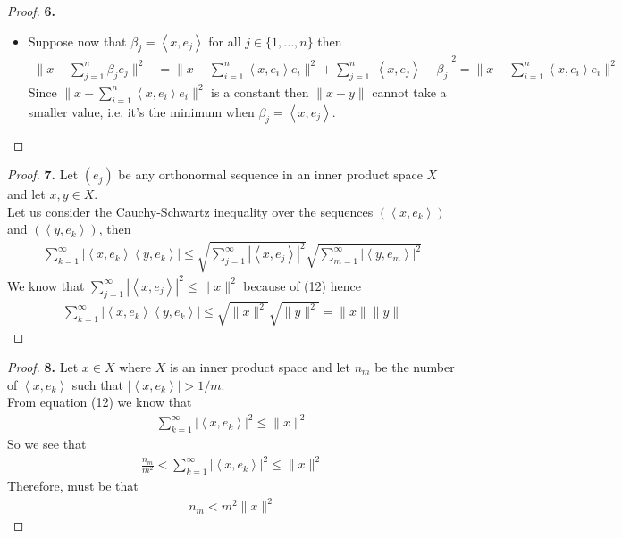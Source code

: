 \documentclass[11pt]{article}
\newcommand{\inprd}[1]{\left\langle{#1}\right\rangle}
\theoremstyle{definition}
\begin{document}
\begin{proof}{\textbf{6.}}
\begin{itemize}
\begin{align*}
    &=\sum_{k=1}^n(\inprd{x, e_k} - \beta_k)
    \sum_{j=1}^n (\inprd{x, e_j} - \beta_j)\inprd{e_k, e_j}\\
    &=\sum_{k=1}^n|\inprd{x, e_k} - \beta_k|^2
\end{align*}
Therefore since the first term, $\|x - \sum_{i=1}^n \inprd{x, e_i} e_i\|^2$,
is constant, and we said that $\|x -y\|^2$ is mininum then must be that
\begin{align*}
    \sum_{k=1}^n|\inprd{x, e_k} - \beta_k|^2 = 0
\end{align*}
And that can only happen if $\beta_k = \inprd{x, e_k}$ for all
$k \in \{1,...,n\}$.
\item [$(\Leftarrow)$] Suppose now that $\beta_j = \inprd{x, e_j}$ for all
$j \in \{1,...,n\}$ then 
\begin{align*}
    \|x - \sum_{j=1}^n \beta_j e_j\|^2
    &= \|x - \sum_{i=1}^n \inprd{x, e_i} e_i\|^2
    + \sum_{j=1}^n|\inprd{x, e_j} - \beta_j|^2
    = \|x - \sum_{i=1}^n \inprd{x, e_i} e_i\|^2
\end{align*}
Since $\|x - \sum_{i=1}^n \inprd{x, e_i} e_i\|^2$ is a constant then
$\|x -y\|$ cannot take a smaller value, i.e. it's the minimum when 
$\beta_j = \inprd{x, e_j}$.
\end{itemize}
\end{proof}

\cleardoublepage
\begin{proof}{\textbf{7.}}
Let $(e_j)$ be any orthonormal sequence in an inner product space $X$ and let
$x,y \in X$.
\\
Let us consider the Cauchy-Schwartz inequality over the sequences $(\inprd{x,e_k})$ 
and $(\inprd{y,e_k})$, then
\begin{align*}
    \sum_{k=1}^\infty |\inprd{x, e_k}\inprd{y, e_k}|
    \leq \sqrt{\sum_{j=1}^\infty|\inprd{x, e_j}|^2}
    \sqrt{\sum_{m=1}^\infty|\inprd{y, e_m}|^2}
\end{align*}
We know that $\sum_{j=1}^\infty|\inprd{x, e_j}|^2 \leq \|x\|^2$ because of (12)
hence
\begin{align*}
    \sum_{k=1}^\infty |\inprd{x, e_k}\inprd{y, e_k}|
    \leq \sqrt{\|x\|^2}\sqrt{\|y\|^2} = \|x\|\|y\|
\end{align*}
\end{proof}

\cleardoublepage
\begin{proof}{\textbf{8.}}
Let $x \in X$ where $X$ is an inner product space and let $n_m$ be the number
of $\inprd{x,e_k}$ such that $|\inprd{x,e_k}| > 1/m$.
\\
From equation (12) we know that
\begin{align*}
    \sum_{k=1}^\infty |\inprd{x,e_k}|^2 \leq \|x\|^2
\end{align*}
So we see that
\begin{align*}
     \frac{n_m}{m^2} < \sum_{k=1}^\infty |\inprd{x,e_k}|^2 \leq \|x\|^2
\end{align*}
Therefore, must be that
\begin{align*}
     n_m < m^2\|x\|^2
\end{align*}

\end{proof}
\end{document}
